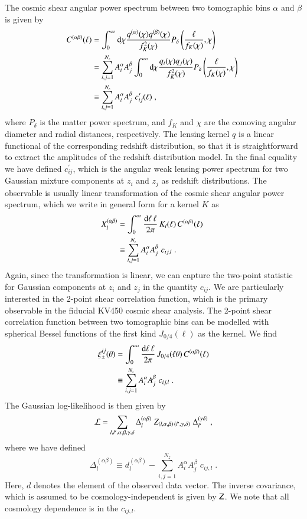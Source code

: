 \documentclass{aa}
\newcommand{\eq}[1]{\begin{equation}  #1 \end{equation}}
\newcommand{\eqa}[1]{\begin{align}   #1 \end{align}}
\newcommand{\br}[1]{\left( #1 \right)}
\newcommand{\nn}{\nonumber}
\newcommand{\dd}{{\rm d}}
\begin{document}
The cosmic shear angular power spectrum between two tomographic bins $\alpha$ and $\beta$ is given by
\eqa{
C^{(\alpha \beta)}(\ell) &= \int_0^\infty \dd \chi \frac{q^{(\alpha)}(\chi) q^{(\beta)}(\chi)}{f_K^2(\chi)} P_\delta\br{\frac{\ell}{f_K(\chi)},\chi}\; \\ \nn
&= \sum_{i,j=1}^{N_z} A_i^\alpha A_j^\beta  \int_0^\infty \dd \chi \frac{q_i(\chi) q_j(\chi)}{f_K^2(\chi)} P_\delta\br{\frac{\ell}{f_K(\chi)},\chi}\; \\ \nn
&\equiv \sum_{i,j=1}^{N_z} A_i^\alpha A_j^\beta\; c^\prime_{ij}(\ell)\;,
}
where $P_\delta$ is the matter power spectrum, and $f_K$ and $\chi$ are the comoving angular diameter and radial distances, respectively. The lensing kernel $q$ is a linear functional of the corresponding redshift distribution, so that it is straightforward to extract the amplitudes of the redshift distribution model. In the final equality we have defined $c^\prime_{ij}$, which is the angular weak lensing power spectrum for two Gaussian mixture components at $z_i$ and $z_j$ as redshift distributions. The observable is usually linear transformation of the cosmic shear angular power spectrum, which we write in general form for a kernel $K$ as
\eqa{
X_l^{(\alpha \beta)} &= \int_0^\infty \frac{\dd \ell\, \ell}{2 \pi}\, K_l(\ell)\, C^{(\alpha \beta)}(\ell)\; \\ \nn
&\equiv \sum_{i,j=1}^{N_z} A_i^\alpha A_j^\beta\; c_{ij,l}\;.
\label{eq:obs}
}
Again, since the transformation is linear, we can capture the two-point statistic for Gaussian components at $z_i$ and $z_j$ in the quantity $c_{ij}$.
We are particularly interested in the 2-point shear correlation function, which is the primary observable in the fiducial KV450 cosmic shear analysis. The 2-point shear correlation function between two tomographic bins can be modelled with spherical Bessel functions of the first kind $J_{0/4}(\ell)$ as the kernel. We find
\eqa{
\xi_\pm^{ij}(\theta) &= \int_0^\infty \frac{\dd \ell\, \ell}{2 \pi}\,J _{0/4}(\ell \theta)\, C^{(\alpha \beta)}(\ell)\\ \nn
&\equiv \sum_{i,j=1}^{N_z} A_i^\alpha A_j^\beta\; c_{ij,l}\;.
}
The Gaussian log-likelihood is then given by
\eq{
{\cal L} = \sum_{l,l',\alpha,\beta,\gamma,\delta} \Delta_l^{(\alpha \beta)}\; Z_{(l,\alpha,\beta) \,  (l',\gamma,\delta)}\; \Delta_{l'}^{(\gamma \delta)}\;,
}
where we have defined
\eq{
\Delta_l^{(\alpha \beta)} \equiv d_l^{(\alpha \beta)} - \sum_{i,j=1}^{N_z} A_i^\alpha A_j^\beta\; c_{ij,l}\;.
}
Here, $d$ denotes the element of the observed data vector. The inverse covariance, which is assumed to be cosmology-independent is given by $\mathsf{Z}$. We note that all cosmology dependence is in the $c_{ij,l}$.
\end{document}
